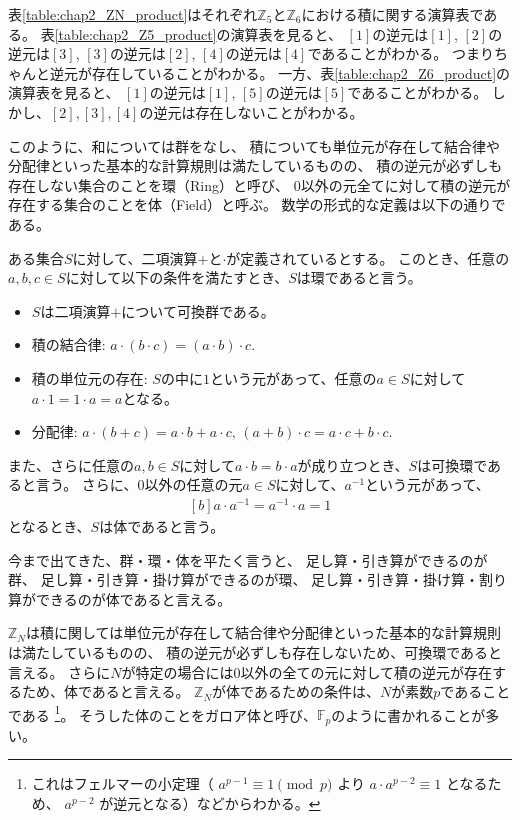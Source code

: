 \documentclass[../master.tex]{subfiles}
\begin{document}
表\ref{table:chap2_ZN_product}はそれぞれ$\mathbb{Z}_5$と$\mathbb{Z}_6$における積に関する演算表である。
表\ref{table:chap2_Z5_product}の演算表を見ると、
$[1]$の逆元は$[1]$,
$[2]$の逆元は$[3]$,
$[3]$の逆元は$[2]$,
$[4]$の逆元は$[4]$であることがわかる。
つまりちゃんと逆元が存在していることがわかる。
一方、表\ref{table:chap2_Z6_product}の演算表を見ると、
$[1]$の逆元は$[1]$,
$[5]$の逆元は$[5]$であることがわかる。
しかし、$[2],[3],[4]$の逆元は存在しないことがわかる。

このように、和については群をなし、
積についても単位元が存在して結合律や分配律といった基本的な計算規則は満たしているものの、
積の逆元が必ずしも存在しない集合のことを環（Ring）と呼び、
$0$以外の元全てに対して積の逆元が存在する集合のことを体（Field）と呼ぶ。
数学の形式的な定義は以下の通りである。
\begin{NoteBox}[title=環と体の定義]{}
    ある集合$S$に対して、二項演算$+$と$\cdot$が定義されているとする。
    このとき、任意の$a,b,c\in S$に対して以下の条件を満たすとき、$S$は環であると言う。
    \begin{itemize}
        \item $S$は二項演算$+$について可換群である。
        \item 積の結合律: $a\cdot (b\cdot c) = (a\cdot b)\cdot c$.
        \item 積の単位元の存在: $S$の中に$1$という元があって、任意の$a\in S$に対して$a\cdot 1=1 \cdot a = a$となる。
        \item 分配律: $a \cdot (b+c) = a \cdot b + a \cdot c,\, (a+b)\cdot c = a \cdot c + b \cdot c$.
    \end{itemize}
    また、さらに任意の$a,b \in S$に対して$a\cdot b = b \cdot a$が成り立つとき、$S$は可換環であると言う。
    さらに、$0$以外の任意の元$a\in S$に対して、$a^{-1}$という元があって、
    \begin{equation}\begin{aligned}[b]
        a \cdot a^{-1} = a^{-1} \cdot a = 1
    \end{aligned}\end{equation}
    となるとき、$S$は体であると言う。
\end{NoteBox}
今まで出てきた、群・環・体を平たく言うと、
足し算・引き算ができるのが群、
足し算・引き算・掛け算ができるのが環、
足し算・引き算・掛け算・割り算ができるのが体であると言える。

$\mathbb{Z}_N$は積に関しては単位元が存在して結合律や分配律といった基本的な計算規則は満たしているものの、
積の逆元が必ずしも存在しないため、可換環であると言える。
さらに$N$が特定の場合には0以外の全ての元に対して積の逆元が存在するため、体であると言える。
$\mathbb{Z}_N$が体であるための条件は、$N$が素数$p$であることである
\footnote{これはフェルマーの小定理（
$a^{p-1} \equiv 1 \pmod p$ より $a \cdot a^{p-2} \equiv 1$ となるため、
$a^{p-2}$ が逆元となる）などからわかる。}。
そうした体のことをガロア体と呼び、$\mathbb{F}_{p}$のように書かれることが多い。
\end{document}
